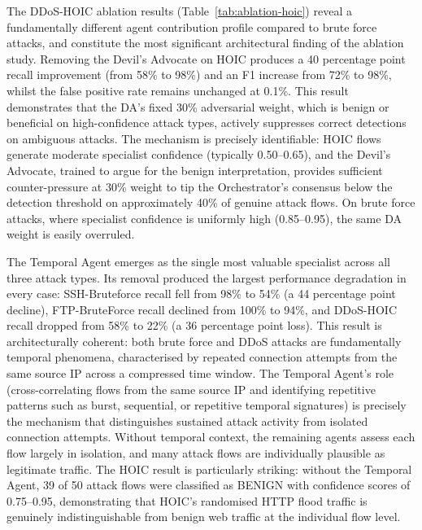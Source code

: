 \documentclass[../main.tex]{subfiles}
\begin{document}
The DDoS-HOIC ablation results (Table~\ref{tab:ablation-hoic}) reveal a fundamentally different agent contribution profile compared to brute force attacks, and constitute the most significant architectural finding of the ablation study. Removing the Devil's Advocate on HOIC produces a 40 percentage point recall improvement (from 58\% to 98\%) and an F1 increase from 72\% to 98\%, whilst the false positive rate remains unchanged at 0.1\%. This result demonstrates that the DA's fixed 30\% adversarial weight, which is benign or beneficial on high-confidence attack types, actively suppresses correct detections on ambiguous attacks. The mechanism is precisely identifiable: HOIC flows generate moderate specialist confidence (typically 0.50--0.65), and the Devil's Advocate, trained to argue for the benign interpretation, provides sufficient counter-pressure at 30\% weight to tip the Orchestrator's consensus below the detection threshold on approximately 40\% of genuine attack flows. On brute force attacks, where specialist confidence is uniformly high (0.85--0.95), the same DA weight is easily overruled.

The Temporal Agent emerges as the single most valuable specialist across all three attack types. Its removal produced the largest performance degradation in every case: SSH-Bruteforce recall fell from 98\% to 54\% (a 44 percentage point decline), FTP-BruteForce recall declined from 100\% to 94\%, and DDoS-HOIC recall dropped from 58\% to 22\% (a 36 percentage point loss). This result is architecturally coherent: both brute force and DDoS attacks are fundamentally temporal phenomena, characterised by repeated connection attempts from the same source IP across a compressed time window. The Temporal Agent's role (cross-correlating flows from the same source IP and identifying repetitive patterns such as burst, sequential, or repetitive temporal signatures) is precisely the mechanism that distinguishes sustained attack activity from isolated connection attempts. Without temporal context, the remaining agents assess each flow largely in isolation, and many attack flows are individually plausible as legitimate traffic. The HOIC result is particularly striking: without the Temporal Agent, 39 of 50 attack flows were classified as BENIGN with confidence scores of 0.75--0.95, demonstrating that HOIC's randomised HTTP flood traffic is genuinely indistinguishable from benign web traffic at the individual flow level.
\end{document}
